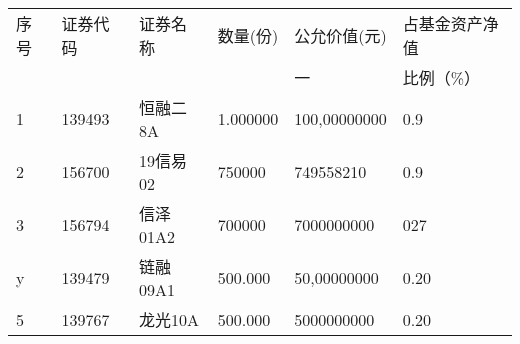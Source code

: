 \begin{table}[]
\begin{tabular}{llllll}
\multirow{2}{*}{序号} & \multirow{2}{*}{证券代码}   & \multirow{2}{*}{证券名称}   & \multirow{2}{*}{数量(份)}    & \multirow{2}{*}{公允价值(元)}      & 占基金资产净值                 \\
                    &                         &                         &                           &                               & \multirow{2}{*}{比例（\%）} \\
                    &                         &                         &                           & 一                             &                         \\
\multirow{2}{*}{1}  & \multirow{2}{*}{139493} & \multirow{2}{*}{恒融二8A}  & \multirow{2}{*}{1.000000} & \multirow{2}{*}{100,00000000} & \multirow{2}{*}{0.9}    \\
                    &                         &                         &                           &                               &                         \\
\multirow{2}{*}{2}  & \multirow{2}{*}{156700} & \multirow{2}{*}{19信易02} & \multirow{2}{*}{750000}   & \multirow{2}{*}{749558210}    & \multirow{2}{*}{0.9}    \\
                    &                         &                         &                           &                               &                         \\
\multirow{2}{*}{3}  & \multirow{2}{*}{156794} & \multirow{2}{*}{信泽01A2} & \multirow{2}{*}{700000}   & \multirow{2}{*}{7000000000}   & \multirow{2}{*}{027}    \\
                    &                         &                         &                           &                               &                         \\
\multirow{2}{*}{y}  & \multirow{2}{*}{139479} & \multirow{2}{*}{链融09A1} & \multirow{2}{*}{500.000}  & \multirow{2}{*}{50,00000000}  & \multirow{2}{*}{0.20}   \\
                    &                         &                         &                           &                               &                         \\
\multirow{2}{*}{5}  & \multirow{2}{*}{139767} & \multirow{2}{*}{龙光10A}  & \multirow{2}{*}{500.000}  & \multirow{2}{*}{5000000000}   & \multirow{2}{*}{0.20}   \\

\end{tabular}
\end{table}
